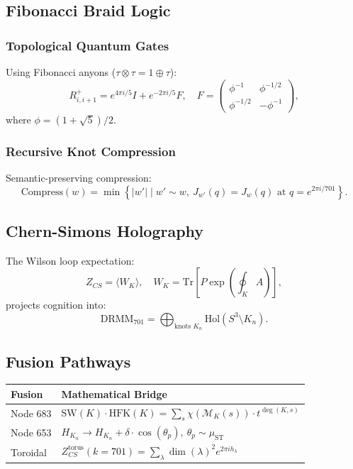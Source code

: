 \documentclass[12pt]{article}
\begin{document}
\begin{center}
\subsection{Fibonacci Braid Logic}
\subsubsection{Topological Quantum Gates}
Using Fibonacci anyons ($\tau \otimes \tau = 1 \oplus \tau$):
\[
R^+_{i,i+1} = e^{4\pi i /5} I + e^{-2\pi i /5} F, \quad F = \begin{pmatrix} \phi^{-1} & \phi^{-1/2} \\ \phi^{-1/2} & -\phi^{-1} \end{pmatrix},
\]
where $\phi = (1 + \sqrt{5})/2$.

\subsubsection{Recursive Knot Compression}
Semantic-preserving compression:
\[
\text{Compress}(w) = \min \left\{ |w'| \mid w' \sim w, \ J_{w'}(q) = J_w(q) \text{ at } q=e^{2\pi i/701} \right\}.
\]

\subsection{Chern-Simons Holography}
The Wilson loop expectation:
\[
Z_{CS} = \langle W_K \rangle, \quad W_K = \text{Tr}\left[ P \exp\left( \oint_K A \right) \right],
\]
projects cognition into:
\[
\text{DRMM}_{701} = \bigoplus_{\text{knots } K_n} \text{Hol}(S^3 \setminus K_n).
\]

\subsection{Fusion Pathways}
\begin{center}
    \begin{tabular}{|l|l|}
        \hline
        \textbf{Fusion} & \textbf{Mathematical Bridge} \\
        \hline
        Node 683 & $\text{SW}(K) \cdot \text{HFK}(K) = \sum_s \chi(\mathcal{M}_K(s)) \cdot t^{\deg(K,s)}$ \\
        Node 653 & $H_{K_n} \to H_{K_n} + \delta \cdot \cos(\theta_p), \ \theta_p \sim \mu_{\text{ST}}$ \\
        Toroidal & $Z_{CS}^{\text{torus}}(k=701) = \sum_\lambda \dim(\lambda)^2 e^{2\pi i h_\lambda}$ \\
        \hline
    \end{tabular}
\end{center}


\end{center}
\end{document}

